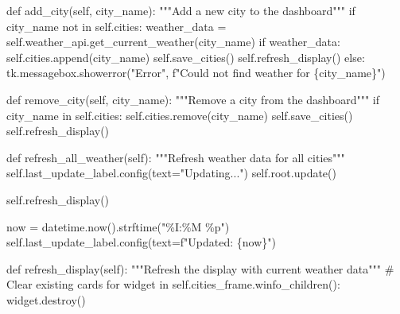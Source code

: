 \documentclass[
  letterpaper,
  DIV=11,
  numbers=noendperiod,
  oneside]{scrreprt}
\newenvironment{Shaded}{}{}
\newcommand{\CommentTok}[1]{\textcolor[rgb]{0.42,0.45,0.49}{#1}}
\newcommand{\ControlFlowTok}[1]{\textcolor[rgb]{0.84,0.23,0.29}{#1}}
\newcommand{\KeywordTok}[1]{\textcolor[rgb]{0.84,0.23,0.29}{#1}}
\newcommand{\NormalTok}[1]{\textcolor[rgb]{0.14,0.16,0.18}{#1}}
\newcommand{\OperatorTok}[1]{\textcolor[rgb]{0.14,0.16,0.18}{#1}}
\newcommand{\SpecialCharTok}[1]{\textcolor[rgb]{0.00,0.36,0.77}{#1}}
\newcommand{\SpecialStringTok}[1]{\textcolor[rgb]{0.01,0.18,0.38}{#1}}
\newcommand{\StringTok}[1]{\textcolor[rgb]{0.01,0.18,0.38}{#1}}
\newcommand{\VariableTok}[1]{\textcolor[rgb]{0.89,0.38,0.04}{#1}}
\begin{document}
\begin{Shaded}
\begin{Highlighting}[]
    \KeywordTok{def}\NormalTok{ add\_city(}\VariableTok{self}\NormalTok{, city\_name):}
        \CommentTok{"""Add a new city to the dashboard"""}
        \ControlFlowTok{if}\NormalTok{ city\_name }\KeywordTok{not} \KeywordTok{in} \VariableTok{self}\NormalTok{.cities:}
\NormalTok{            weather\_data }\OperatorTok{=} \VariableTok{self}\NormalTok{.weather\_api.get\_current\_weather(city\_name)}
            \ControlFlowTok{if}\NormalTok{ weather\_data:}
                \VariableTok{self}\NormalTok{.cities.append(city\_name)}
                \VariableTok{self}\NormalTok{.save\_cities()}
                \VariableTok{self}\NormalTok{.refresh\_display()}
            \ControlFlowTok{else}\NormalTok{:}
\NormalTok{                tk.messagebox.showerror(}\StringTok{"Error"}\NormalTok{, }\SpecialStringTok{f"Could not find weather for }\SpecialCharTok{\{}\NormalTok{city\_name}\SpecialCharTok{\}}\SpecialStringTok{"}\NormalTok{)}
    
    \KeywordTok{def}\NormalTok{ remove\_city(}\VariableTok{self}\NormalTok{, city\_name):}
        \CommentTok{"""Remove a city from the dashboard"""}
        \ControlFlowTok{if}\NormalTok{ city\_name }\KeywordTok{in} \VariableTok{self}\NormalTok{.cities:}
            \VariableTok{self}\NormalTok{.cities.remove(city\_name)}
            \VariableTok{self}\NormalTok{.save\_cities()}
            \VariableTok{self}\NormalTok{.refresh\_display()}
    
    \KeywordTok{def}\NormalTok{ refresh\_all\_weather(}\VariableTok{self}\NormalTok{):}
        \CommentTok{"""Refresh weather data for all cities"""}
        \VariableTok{self}\NormalTok{.last\_update\_label.config(text}\OperatorTok{=}\StringTok{"Updating..."}\NormalTok{)}
        \VariableTok{self}\NormalTok{.root.update()}
        
        \VariableTok{self}\NormalTok{.refresh\_display()}
        
\NormalTok{        now }\OperatorTok{=}\NormalTok{ datetime.now().strftime(}\StringTok{"\%I:\%M \%p"}\NormalTok{)}
        \VariableTok{self}\NormalTok{.last\_update\_label.config(text}\OperatorTok{=}\SpecialStringTok{f"Updated: }\SpecialCharTok{\{}\NormalTok{now}\SpecialCharTok{\}}\SpecialStringTok{"}\NormalTok{)}
    
    \KeywordTok{def}\NormalTok{ refresh\_display(}\VariableTok{self}\NormalTok{):}
        \CommentTok{"""Refresh the display with current weather data"""}
        \CommentTok{\# Clear existing cards}
        \ControlFlowTok{for}\NormalTok{ widget }\KeywordTok{in} \VariableTok{self}\NormalTok{.cities\_frame.winfo\_children():}
\NormalTok{            widget.destroy()}
        

\end{Highlighting}
\end{Shaded}
\end{document}
